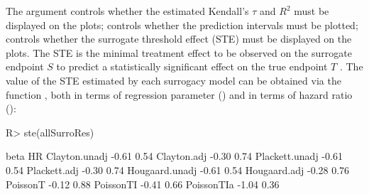 \documentclass[article,shortnames, nojss]{jss}\usepackage[]{graphicx}\usepackage[]{color}
\begin{document}
The argument  controls whether the estimated
  Kendall's $\tau$ and $R^2$ must be displayed on the plots;
   controls whether the prediction intervals
  must be plotted;
   controls whether the surrogate threshold effect (STE)
  must be displayed on the plots.
The STE is the minimal treatment effect to be observed 
  on the surrogate endpoint $S$ to predict a statistically significant effect
  on the true endpoint $T$ \citep{BurzykowskiBuyse06}.
The value of the STE estimated by each surrogacy model can be obtained
  via the function ,
  both in terms of regression parameter ()
  and in terms of hazard ratio ():
\begin{Schunk}
\begin{Sinput}
R>   ste(allSurroRes)
\end{Sinput}
\begin{Soutput}
                beta   HR
Clayton.unadj  -0.61 0.54
Clayton.adj    -0.30 0.74
Plackett.unadj -0.61 0.54
Plackett.adj   -0.30 0.74
Hougaard.unadj -0.61 0.54
Hougaard.adj   -0.28 0.76
PoissonT       -0.12 0.88
PoissonTI      -0.41 0.66
PoissonTIa     -1.04 0.36
\end{Soutput}
\end{Schunk}


\end{document}

